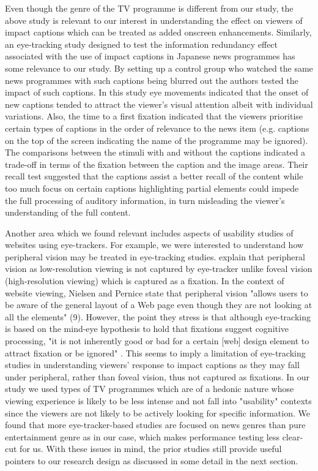 \documentclass[output=paper]{langsci/langscibook}
\begin{document}
Even though the genre of the TV programme is different from our study, the above study is relevant to our interest in understanding the effect on viewers of impact captions which can be treated as added onscreen enhancements. Similarly, an eye-tracking study \citep{Matsukawa2009} designed to test the information redundancy effect associated with the use of impact captions in Japanese news programmes has some relevance to our study.  By setting up a control group who watched the same news programmes with such captions being blurred out the authors tested the impact of such captions.  In this study eye movements indicated that the onset of new captions tended to attract the viewer's visual attention albeit with individual variations. Also, the time to a first fixation indicated that the viewers prioritise certain types of captions in the order of relevance to the news item (e.g. captions on the top of the screen indicating the name of the programme may be ignored). The comparisons between the stimuli with and without the captions indicated a trade-off in terms of the fixation between the caption and the image areas. Their recall test suggested that the captions assist a better recall of the content while too much focus on certain captions highlighting partial elements could impede the full processing of auditory information, in turn misleading the viewer's understanding of the full content.       



Another area which we found relevant includes aspects of usability studies of websites using eye-trackers. For example, we were interested to understand how peripheral vision may be treated in eye-tracking studies.  \citet[pp. 6--7]{Nielsen2010} explain that peripheral vision as low-resolution viewing is not captured by eye-tracker unlike foveal vision (high-resolution viewing) which is captured as a fixation.  In the context of website viewing, Nielsen and Pernice state that peripheral vision "allows users to be aware of the general layout of a Web page even though they are not looking at all the elements" (9). However, the point they stress is that although eye-tracking is based on the mind-eye hypothesis to hold that fixations suggest cognitive processing, "it is not inherently good or bad for a certain [web] design element to attract fixation or be ignored" \citep[p. 10]{Nielsen2010}.  This seems to imply a limitation of eye-tracking studies in understanding viewers' response to impact captions as they may fall under peripheral, rather than foveal vision, thus not captured as fixations. In our study we used types of TV programmes which are of a hedonic nature whose viewing experience is likely to be less intense and not fall into "usability" contexts since the viewers are not likely to be actively looking for specific information.  We found that more eye-tracker-based studies are focused on news genres than pure entertainment genre as in our case, which makes performance testing less clear-cut for us.  With these issues in mind, the prior studies still provide useful pointers to our research design as discussed in some detail in the next section. 
\end{document}
